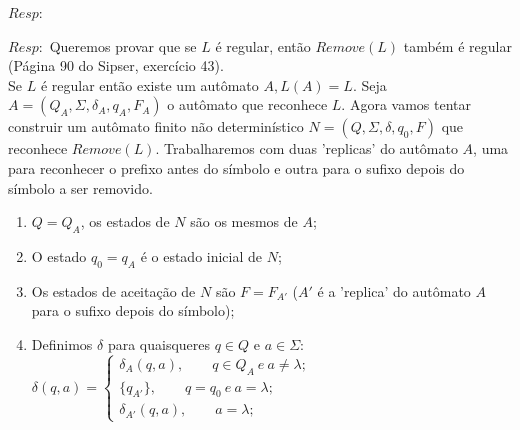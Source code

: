 \documentclass{homework}
\begin{document}
	$Resp:$	
		 

	$Resp:$	Queremos provar que se $L$ é regular, então $Remove(L)$ também é regular (Página 90 do Sipser, exercício 43).\\
	Se $L$ é regular então existe um autômato $A,L(A)=L$. Seja $A = (Q_A,\Sigma,\delta_A,q_A,F_A)$ o autômato que reconhece $L$. Agora vamos tentar construir um autômato finito não determinístico $N = (Q,\Sigma,\delta,q_0,F)$ que reconhece $Remove(L)$. Trabalharemos com duas 'replicas' do autômato $A$, uma para reconhecer o prefixo antes do símbolo e outra para o sufixo depois do símbolo a ser removido.
	\begin{enumerate}
		\item $Q = Q_A$, os estados de $N$ são os mesmos de $A$;
		\item O estado $q_0 = q_A$ é o estado inicial de $N$;
		\item Os estados de aceitação de $N$ são $F = F_{A'}$ ($A'$ é a 'replica' do autômato $A$ para o sufixo depois do símbolo);
		\item Definimos $\delta$ para quaisqueres $q \in Q$ e $a \in \Sigma$:\\
		$\delta(q,a) = \begin{cases}
							\delta_A(q,a),\qquad q \in Q_A \ e \ a \neq \lambda;\\
							\{q_{A'}\},\qquad q = q_0 \ e \ a = \lambda;\\
							\delta_{A'}(q,a), \qquad  a = \lambda;
					   \end{cases}					  
		$
	\end{enumerate}
\end{document}
